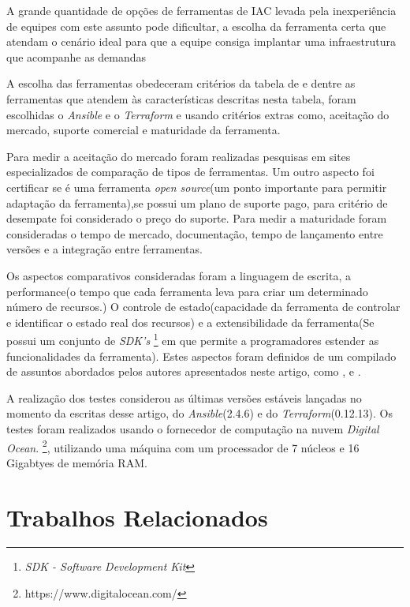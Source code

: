 A grande quantidade de opções de ferramentas de IAC levada pela inexperiência de equipes com este assunto pode dificultar, a escolha da ferramenta certa que atendam o cenário ideal para que a equipe consiga implantar uma infraestrutura que acompanhe as demandas 

A escolha das ferramentas obedeceram critérios da tabela de  e dentre as ferramentas que atendem às características descritas nesta tabela, foram escolhidas o \textit{Ansible} e o \textit{Terraform} e usando critérios extras como, aceitação do mercado, suporte comercial e maturidade da ferramenta.

Para medir a aceitação do mercado foram realizadas pesquisas em sites especializados de comparação de tipos de ferramentas. Um outro aspecto foi certificar se é uma ferramenta \textit{open source}(um ponto importante para permitir adaptação da ferramenta),se possui um plano de suporte pago, para critério de desempate foi considerado o preço do suporte. Para medir a maturidade foram consideradas o tempo de mercado, documentação, tempo de lançamento entre versões e a integração entre ferramentas.

Os aspectos comparativos consideradas foram a linguagem de escrita, a performance(o tempo que cada ferramenta leva para criar um determinado número de recursos.) O controle de estado(capacidade da ferramenta  de controlar e identificar o estado real dos recursos) e a extensibilidade da ferramenta(Se possui um conjunto de \textit{SDK's} \footnote{\textit{SDK - Software Development Kit}} em que permite a programadores estender as funcionalidades da ferramenta).  Estes aspectos foram definidos de um compilado de assuntos abordados pelos autores apresentados neste artigo, como \cite{steve}, \cite{masek} e \cite{Morris:2016:ICM:3006361}.

A realização dos testes considerou as últimas versões estáveis lançadas no momento da escritas desse artigo, do \textit{Ansible}(2.4.6) e do \textit{Terraform}(0.12.13). Os testes foram realizados usando o fornecedor de computação na nuvem  \textit{Digital Ocean}. \footnote{https://www.digitalocean.com/}, utilizando uma máquina com um processador de 7 núcleos e 16 Gigabtyes de memória RAM.   


\section{\esp Trabalhos Relacionados} \label{relacionados}


